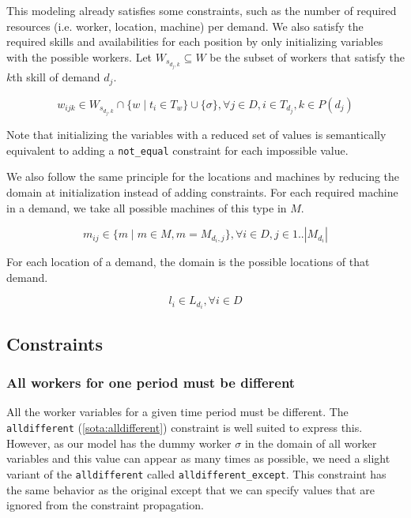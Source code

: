 \documentclass[../../thesis.tex]{subfiles}
\begin{document}
This modeling already satisfies some constraints, such as the number of required resources (i.e. worker, location, machine)
per demand. We also satisfy the required skills and availabilities for each position by only initializing variables with the 
possible workers. Let $W_{s_{d_j,k}} \subseteq W$ be the subset of workers that satisfy the $k$th skill of demand $d_j$.

\begin{equation}
  \label{wdomain}
  w_{ijk} \in W_{s_{d_j,k}} \cap \{ w \mid t_i \in T_w \} \cup \{ \sigma \}, \forall j \in D, i \in T_{d_j}, k \in P(d_j)
\end{equation}

Note that initializing the variables with a reduced set of values is semantically equivalent to adding a \texttt{not\_equal} constraint for each impossible value.


We also follow the same principle for the locations and machines by reducing the domain at initialization instead of adding constraints.
For each required machine in a demand, we take all possible machines of this type in $M$.

\begin{equation}
  \label{mdomain}
  m_{ij} \in \{ m \mid m \in M, m = M_{{d_i},j}  \}, \forall i \in D, j \in 1..|M_{d_i}|
\end{equation}

For each location of a demand, the domain is the possible locations of that demand.

\begin{equation}
  \label{ldomain}
  l_i \in L_{d_i}, \forall i \in D
\end{equation}


\subsection{Constraints}

\subsubsection{All workers for one period must be different}

All the worker variables for a given time period must be different. 
The \texttt{alldifferent} (\autoref{sota:alldifferent}) constraint is well suited to express this. 
However, as our model has the dummy worker $\sigma$ in the domain of all worker variables and this value 
can appear as many times as possible, we need a slight variant of the \texttt{alldifferent} called \texttt{alldifferent\_except}. 
This constraint has the same behavior as the original except that we can specify values that are ignored from 
the constraint propagation.
\end{document}

